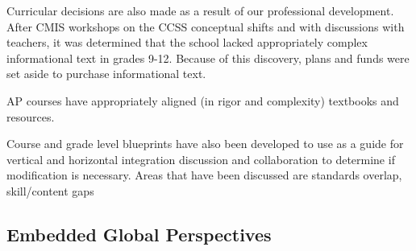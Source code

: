 \documentclass{report}
\begin{document}
\begin{findings}
Curricular decisions are also made as a result of our professional development.  After CMIS workshops on the CCSS conceptual shifts and with discussions with teachers, it was determined that the school lacked appropriately complex informational text in grades 9-12. Because of this discovery, plans and funds were set aside to purchase informational text. 

AP courses have appropriately aligned (in rigor and complexity) textbooks and resources.  

Course and grade level blueprints have also been developed to use as a guide for vertical and horizontal integration discussion and collaboration to determine if modification is necessary. Areas that have been discussed are standards overlap, skill/content gaps
\end{findings}

\subsection{Embedded Global Perspectives}

\end{document}
